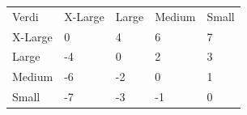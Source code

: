 \documentclass[12pt]{article}
\newcommand{\invis}{\phantom{a}}
\newcommand{\cellr}{\cellcolor{red!25}}
\newcommand{\cello}{\cellcolor{orange!25}}
\newcommand{\celly}{\cellcolor{yellow!25}}
\newcommand{\celll}{\cellcolor{lime!25}}
\newcommand{\cellg}{\cellcolor{green!25}}
\begin{document}
    \begin{tabular}{|p{2cm}|
        >{\centering\arraybackslash}p{3cm}|
        >{\centering\arraybackslash}p{3cm}|
        >{\centering\arraybackslash}p{3cm}|
        >{\centering\arraybackslash}p{3cm}|}     
        \hline 
        \invis & \multicolumn{4}{|c|}{Utviklingsstørrelse}\\
        \hline
        Verdi & X-Large & Large & Medium & Small\\
        \hline
        X-Large &   \celly0 &
                    \cellg4 &
                    \cellg6 &
                    \cellg7 \\
        \hline
        Large &     \cellr-4 &
                    \celly0 &
                    \celll2 &
                    \cellg3 \\
        \hline
        Medium &    \cellr-6 &
                    \cello-2 &
                    \celly0 &
                    \celll1 \\
        \hline
        Small &     \cellr-7 &
                    \cellr-3 &
                    \cello-1 &
                    \celly0 \\
        \hline 
    \end{tabular}
\end{document}
